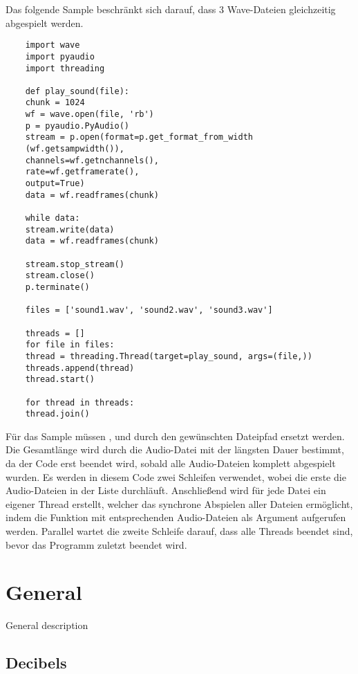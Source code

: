 Das folgende Sample beschränkt sich darauf, dass 3 Wave-Dateien gleichzeitig abgespielt werden.

\begin{verbatim}
    import wave
    import pyaudio
    import threading
    
    def play_sound(file):
    chunk = 1024
    wf = wave.open(file, 'rb')
    p = pyaudio.PyAudio()
    stream = p.open(format=p.get_format_from_width
    (wf.getsampwidth()),
    channels=wf.getnchannels(),
    rate=wf.getframerate(),
    output=True)
    data = wf.readframes(chunk)
    
    while data:
    stream.write(data)
    data = wf.readframes(chunk)
    
    stream.stop_stream()
    stream.close()
    p.terminate()
    
    files = ['sound1.wav', 'sound2.wav', 'sound3.wav']
    
    threads = []
    for file in files:
    thread = threading.Thread(target=play_sound, args=(file,))
    threads.append(thread)
    thread.start()
    
    for thread in threads:
    thread.join()
\end{verbatim}

Für das Sample müssen ,  und  durch  den gewünschten Dateipfad ersetzt werden. Die Gesamtlänge wird durch die Audio-Datei mit der längsten Dauer bestimmt, da der Code erst beendet wird, sobald alle Audio-Dateien komplett abgespielt wurden. Es werden in diesem Code zwei Schleifen verwendet, wobei die erste die Audio-Dateien in der Liste  durchläuft. Anschließend wird für jede Datei ein eigener Thread erstellt, welcher das synchrone Abspielen aller Dateien ermöglicht, indem die Funktion  mit entsprechenden Audio-Dateien als Argument aufgerufen werden. Parallel wartet die zweite Schleife darauf, dass alle Threads beendet sind, bevor das Programm zuletzt beendet wird.

\section{General}

General description





\subsection{Decibels}

